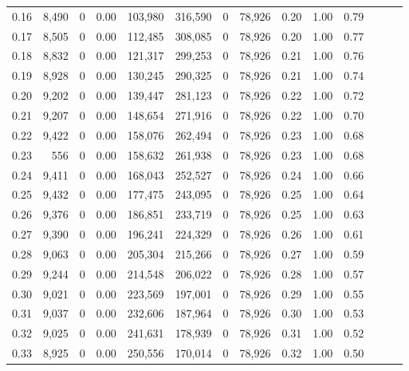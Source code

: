 \begin{tabular}{rrrrrrrrrrrrrr}
0.16 &   8,490 &      0 &  0.00 &  103,980 &  316,590 &       0 &  78,926 &  0.20 &  1.00 &      0.79 \\
0.17 &   8,505 &      0 &  0.00 &  112,485 &  308,085 &       0 &  78,926 &  0.20 &  1.00 &      0.77 \\
0.18 &   8,832 &      0 &  0.00 &  121,317 &  299,253 &       0 &  78,926 &  0.21 &  1.00 &      0.76 \\
0.19 &   8,928 &      0 &  0.00 &  130,245 &  290,325 &       0 &  78,926 &  0.21 &  1.00 &      0.74 \\
0.20 &   9,202 &      0 &  0.00 &  139,447 &  281,123 &       0 &  78,926 &  0.22 &  1.00 &      0.72 \\
0.21 &   9,207 &      0 &  0.00 &  148,654 &  271,916 &       0 &  78,926 &  0.22 &  1.00 &      0.70 \\
0.22 &   9,422 &      0 &  0.00 &  158,076 &  262,494 &       0 &  78,926 &  0.23 &  1.00 &      0.68 \\
0.23 &     556 &      0 &  0.00 &  158,632 &  261,938 &       0 &  78,926 &  0.23 &  1.00 &      0.68 \\
0.24 &   9,411 &      0 &  0.00 &  168,043 &  252,527 &       0 &  78,926 &  0.24 &  1.00 &      0.66 \\
0.25 &   9,432 &      0 &  0.00 &  177,475 &  243,095 &       0 &  78,926 &  0.25 &  1.00 &      0.64 \\
0.26 &   9,376 &      0 &  0.00 &  186,851 &  233,719 &       0 &  78,926 &  0.25 &  1.00 &      0.63 \\
0.27 &   9,390 &      0 &  0.00 &  196,241 &  224,329 &       0 &  78,926 &  0.26 &  1.00 &      0.61 \\
0.28 &   9,063 &      0 &  0.00 &  205,304 &  215,266 &       0 &  78,926 &  0.27 &  1.00 &      0.59 \\
0.29 &   9,244 &      0 &  0.00 &  214,548 &  206,022 &       0 &  78,926 &  0.28 &  1.00 &      0.57 \\
0.30 &   9,021 &      0 &  0.00 &  223,569 &  197,001 &       0 &  78,926 &  0.29 &  1.00 &      0.55 \\
0.31 &   9,037 &      0 &  0.00 &  232,606 &  187,964 &       0 &  78,926 &  0.30 &  1.00 &      0.53 \\
0.32 &   9,025 &      0 &  0.00 &  241,631 &  178,939 &       0 &  78,926 &  0.31 &  1.00 &      0.52 \\
0.33 &   8,925 &      0 &  0.00 &  250,556 &  170,014 &       0 &  78,926 &  0.32 &  1.00 &      0.50 \\

\end{tabular}
